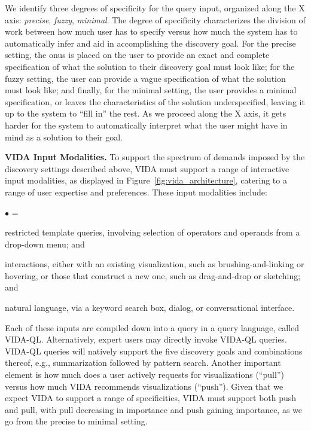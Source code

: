 \documentclass[11pt]{article}
\newcommand{\squishlist}{
   \begin{list}{$\bullet$}
    { \setlength{\itemsep}{0pt}
      \setlength{\parsep}{2pt}
      \setlength{\topsep}{0pt}
      \setlength{\partopsep}{0pt}
      \leftmargin=25pt
\rightmargin=0pt
\labelsep=5pt
\labelwidth=10pt
\itemindent=0pt
\listparindent=0pt
\itemsep=\parsep
    }
}
\newcommand{\squishend}{\end{list}}
\newcommand{\stitle}[1]{\par\noindent\textbf{#1}}
\newcommand{\vida}{\textsc{VIDA}\xspace}
\newcommand{\vidaql}{\textsc{VIDA-QL}\xspace}
\begin{document}
\par 
 We identify three degrees of specificity
for the query input, organized along the X axis:
{\em precise}, {\em fuzzy}, {\em minimal}.
The degree of specificity characterizes the division
of work between how much user has to specify
versus how much the system has to automatically
infer and aid in accomplishing the discovery goal. 
For the precise setting, the onus is placed on the user
to provide an exact and complete specification of 
what the solution to their discovery
goal must look like;
for the fuzzy setting, the user can provide
a vague specification of what the solution must look like;
and finally, for the minimal setting,
the user provides a minimal specification, or
leaves the characteristics of the solution underspecified,
leaving it up to the system to ``fill in'' the rest.
As we proceed along the X axis,
it gets harder for the system to automatically
interpret what the user might have in mind as a solution
to their goal.

\par \stitle{\vida Input Modalities.} To support the spectrum of 
demands imposed by the
discovery settings described above, \vida 
must support a range of interactive input modalities,
as displayed in Figure~\ref{fig:vida_architecture},
catering to a range of user expertise and preferences.
These input modalities include: 
\squishlist
	\item restricted template queries, involving selection of operators and operands from a drop-down menu; and
	\item interactions, either with an existing visualization, such as brushing-and-linking or hovering, or those that construct a new one, such as drag-and-drop or sketching; and
	\item natural language, via a keyword search box, dialog, or conversational interface.
\squishend
Each of these inputs are compiled down
into a query in a query language, called \vidaql.
Alternatively, expert users may directly invoke \vidaql queries.
\vidaql queries will natively support the five discovery goals and combinations thereof, e.g., summarization followed by pattern search. Another important element is how much does a user actively requests for visualizations (``pull'') versus how much \vida recommends visualizations (``push''). Given that we expect \vida to support a range of specificities, \vida must support both push and pull, with pull decreasing in importance and push gaining importance, as we go from the precise to minimal setting.
\end{document}
